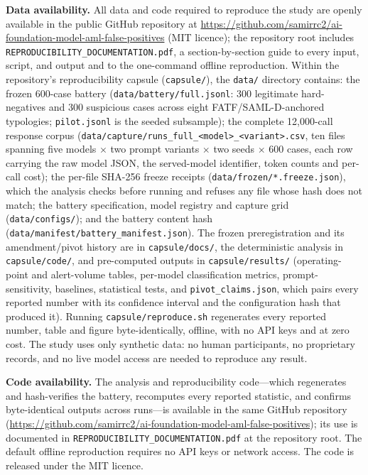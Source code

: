 \documentclass[pdflatex,sn-basic,Numbered]{sn-jnl}
\begin{document}
\textbf{Data availability.} All data and code required to reproduce the study are openly available in the public GitHub repository at \url{https://github.com/samirrc2/ai-foundation-model-aml-false-positives} (MIT licence); the repository root includes \texttt{REPRODUCIBILITY\_DOCUMENTATION.pdf}, a section-by-section guide to every input, script, and output and to the one-command offline reproduction. Within the repository's reproducibility capsule (\texttt{capsule/}), the \texttt{data/} directory contains: the frozen 600-case battery (\texttt{data/battery/full.jsonl}: 300 legitimate hard-negatives and 300 suspicious cases across eight FATF/SAML-D-anchored typologies; \texttt{pilot.jsonl} is the seeded subsample); the complete 12,000-call response corpus (\texttt{data/capture/runs\_full\_<model>\_<variant>.csv}, ten files spanning five models $\times$ two prompt variants $\times$ two seeds $\times$ 600 cases, each row carrying the raw model JSON, the served-model identifier, token counts and per-call cost); the per-file SHA-256 freeze receipts (\texttt{data/frozen/*.freeze.json}), which the analysis checks before running and refuses any file whose hash does not match; the battery specification, model registry and capture grid (\texttt{data/configs/}); and the battery content hash (\texttt{data/manifest/battery\_manifest.json}). The frozen preregistration and its amendment/pivot history are in \texttt{capsule/docs/}, the deterministic analysis in \texttt{capsule/code/}, and pre-computed outputs in \texttt{capsule/results/} (operating-point and alert-volume tables, per-model classification metrics, prompt-sensitivity, baselines, statistical tests, and \texttt{pivot\_claims.json}, which pairs every reported number with its confidence interval and the configuration hash that produced it). Running \texttt{capsule/reproduce.sh} regenerates every reported number, table and figure byte-identically, offline, with no API keys and at zero cost. The study uses only synthetic data: no human participants, no proprietary records, and no live model access are needed to reproduce any result.

\textbf{Code availability.} The analysis and reproducibility code---which regenerates and hash-verifies the battery, recomputes every reported statistic, and confirms byte-identical outputs across runs---is available in the same GitHub repository (\url{https://github.com/samirrc2/ai-foundation-model-aml-false-positives}); its use is documented in \texttt{REPRODUCIBILITY\_DOCUMENTATION.pdf} at the repository root. The default offline reproduction requires no API keys or network access. The code is released under the MIT licence.
\end{document}
